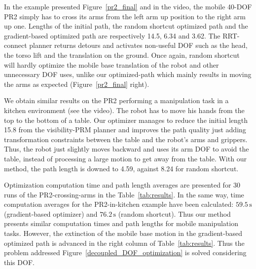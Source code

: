 \documentclass{tADR2e}
\begin{document}
In the example presented Figure~\ref{pr2_final} and in the video, the mobile 
40-DOF PR2 simply has to cross its arms from 
the left arm up position to the right arm up one. Lengths of the initial path, the 
random shortcut optimized path and the gradient-based optimized path are 
respectively 14.5, 6.34 and 3.62. The RRT-connect planner 
returns detours and activates non-useful DOF such as the head, the torso lift 
and the translation on 
the ground. Once again, random shortcut will hardly optimize the mobile base 
translation of the robot and other unnecessary DOF uses, unlike our 
optimized-path which mainly results in moving the arms as expected 
(Figure~\ref{pr2_final} right).

We obtain similar results on the PR2 performing a manipulation task 
in a kitchen environment (see the video). The robot has to move 
his hands from the top to the bottom of a table.
Our optimizer manages to reduce the initial length 15.8 from the visibility-PRM 
planner and improves the path quality 
just adding transformation constraints between the table and the 
robot's arms and grippers. Thus, the robot just slightly moves 
backward and uses its arm DOF to avoid the table, instead of 
processing a large motion to get away from the table. With our method, the path length is downed to 4.59, against 8.24 for random shortcut.

Optimization computation time and path length averages are presented for 30 runs of the PR2-crossing-arms in the Table~\ref{tab:results}. In the same way, time computation averages for the PR2-in-kitchen example have been 
calculated: $59.5\,\text{s}$ (gradient-based optimizer) and $76.2\,\text{s}$ (random shortcut).
Thus our method presents 
similar computation times and path lengths for mobile manipulation tasks. However, the extinction of the mobile base motion in the gradient-based optimized path is advanced in the right column of Table~\ref{tab:results}. Thus the problem addressed 
Figure~\ref{decoupled_DOF_optimization} is solved considering this DOF.
\end{document}
